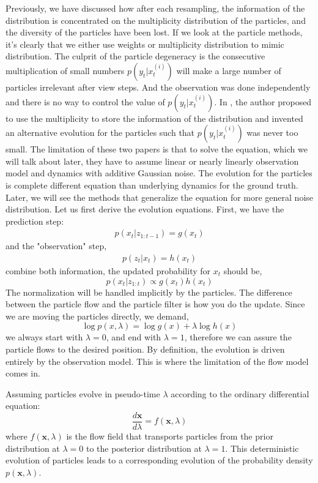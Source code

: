 \documentclass{article}
\renewcommand{\v}[1]{ \ensuremath{ {\mathbf{#1}} }}
\begin{document}
Previously, we have discussed how after each resampling, the information of the distribution is concentrated on the multiplicity distribution of the particles, and the diversity of the particles have been lost. If we look at the particle methods, it's clearly that we either use weights or multiplicity distribution to mimic distribution. The culprit of the particle degeneracy is the consecutive multiplication of small numbers $p(y_t | x_t^{(i)})$ will make a large number of particles irrelevant after view steps. And the observation was done independently and there is no way to control the value of $p(y_t | x_t^{(i)})$. In \cite{daum2010exact,daum2011particle}, the author proposed to use the multiplicity to store the information of the distribution and invented an alternative evolution for the particles such that $p(y_t | x_t^{(i)})$ was never too small. The limitation of these two papers is that to solve the equation, which we will talk about later, they have to assume linear or nearly linearly observation model and dynamics with additive Gaussian noise. The evolution for the particles is complete different equation than underlying dynamics for the ground truth. Later, we will see the methods that generalize the equation for more general noise distribution. Let us first derive the evolution equations. First, we have the prediction step: 
\begin{align}
p(x_t | z_{1:t-1})=g(x_t)
\end{align}
and the "observation" step,
\begin{align}
p(z_t | x_t)=h(x_t)
\end{align}
combine both information, the updated probability for $x_t$ should be,
\begin{equation}
p(x_t|z_{1:t}) \propto g(x_t)h(x_t)
\end{equation}
The normalization will be handled implicitly by the particles. The difference between the particle flow and the particle filter is how you do the update. Since we are moving the particles directly, we demand,
\begin{equation}
\log p(x,\lambda) = \log g(x) + \lambda \log h(x)
\end{equation}
we always start with $\lambda=0$, and end with $\lambda=1$, therefore we can assure the particle flows to the desired position. By definition, the evolution is driven entirely by the observation model. This is where the limitation of the flow model comes in.

Assuming particles evolve in pseudo-time $\lambda$ according to the ordinary differential equation:
\begin{equation}
\frac{d\v{x}}{d\lambda} = f(\v{x}, \lambda)
\end{equation}
where $f(\v{x}, \lambda)$ is the flow field that transports particles from the prior distribution at $\lambda=0$ to the posterior distribution at $\lambda=1$. This deterministic evolution of particles leads to a corresponding evolution of the probability density $p(\v{x}, \lambda)$.
\end{document}
